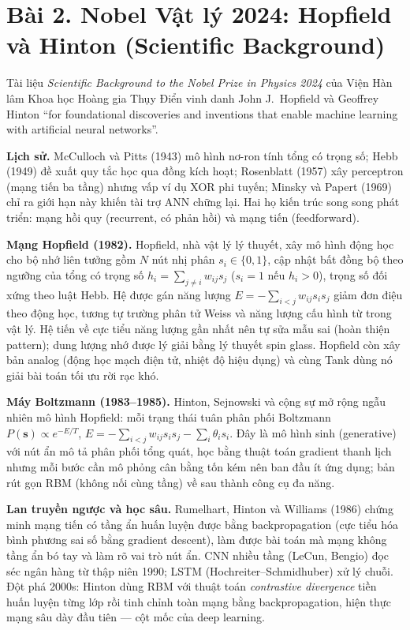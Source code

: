 \documentclass[a4paper,12pt]{article}
\begin{document}
\newpage

\section*{Bài 2. Nobel Vật lý 2024: Hopfield và Hinton (Scientific Background)}

Tài liệu \textit{Scientific Background to the Nobel Prize in Physics 2024} của Viện Hàn lâm Khoa học Hoàng gia Thụy Điển vinh danh John J.~Hopfield và Geoffrey Hinton ``for foundational discoveries and inventions that enable machine learning with artificial neural networks''.

\textbf{Lịch sử.} McCulloch và Pitts (1943) mô hình nơ-ron tính tổng có trọng số; Hebb (1949) đề xuất quy tắc học qua đồng kích hoạt; Rosenblatt (1957) xây perceptron (mạng tiến ba tầng) nhưng vấp ví dụ XOR phi tuyến; Minsky và Papert (1969) chỉ ra giới hạn này khiến tài trợ ANN chững lại. Hai họ kiến trúc song song phát triển: mạng hồi quy (recurrent, có phản hồi) và mạng tiến (feedforward).

\textbf{Mạng Hopfield (1982).} Hopfield, nhà vật lý lý thuyết, xây mô hình động học cho bộ nhớ liên tưởng gồm $N$ nút nhị phân $s_i \in \{0,1\}$, cập nhật bất đồng bộ theo ngưỡng của tổng có trọng số $h_i=\sum_{j \ne i} w_{ij}s_j$ ($s_i=1$ nếu $h_i>0$), trọng số đối xứng theo luật Hebb. Hệ được gán năng lượng $E=-\sum_{i<j} w_{ij}s_is_j$ giảm đơn điệu theo động học, tương tự trường phân tử Weiss và năng lượng cấu hình từ trong vật lý. Hệ tiến về cực tiểu năng lượng gần nhất nên tự sửa mẫu sai (hoàn thiện pattern); dung lượng nhớ được lý giải bằng lý thuyết spin glass. Hopfield còn xây bản analog (động học mạch điện tử, nhiệt độ hiệu dụng) và cùng Tank dùng nó giải bài toán tối ưu rời rạc khó.

\textbf{Máy Boltzmann (1983--1985).} Hinton, Sejnowski và cộng sự mở rộng ngẫu nhiên mô hình Hopfield: mỗi trạng thái tuân phân phối Boltzmann $P(\mathbf{s}) \propto e^{-E/T}$, $E=-\sum_{i<j} w_{ij}s_is_j-\sum_i \theta_i s_i$. Đây là mô hình sinh (generative) với nút ẩn mô tả phân phối tổng quát, học bằng thuật toán gradient thanh lịch nhưng mỗi bước cần mô phỏng cân bằng tốn kém nên ban đầu ít ứng dụng; bản rút gọn RBM (không nối cùng tầng) về sau thành công cụ đa năng.

\textbf{Lan truyền ngược và học sâu.} Rumelhart, Hinton và Williams (1986) chứng minh mạng tiến có tầng ẩn huấn luyện được bằng backpropagation (cực tiểu hóa bình phương sai số bằng gradient descent), làm được bài toán mà mạng không tầng ẩn bó tay và làm rõ vai trò nút ẩn. CNN nhiều tầng (LeCun, Bengio) đọc séc ngân hàng từ thập niên 1990; LSTM (Hochreiter--Schmidhuber) xử lý chuỗi. Đột phá 2000s: Hinton dùng RBM với thuật toán \textit{contrastive divergence} tiền huấn luyện từng lớp rồi tinh chỉnh toàn mạng bằng backpropagation, hiện thực mạng sâu dày đầu tiên --- cột mốc của deep learning.
\end{document}
